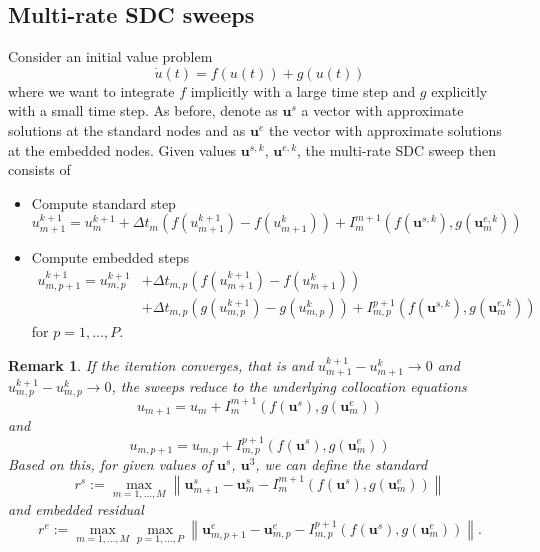 \documentclass{article}
\newtheorem{remark}{Remark}
\newcommand{\ve}[1]{\mathbf{#1}}
\begin{document}
\subsection*{Multi-rate SDC sweeps}
Consider an initial value problem
\begin{equation}
	\dot{u}(t) = f(u(t)) + g(u(t))
\end{equation}
where we want to integrate $f$ implicitly with a large time step and $g$ explicitly with a small time step.
As before, denote as $\ve{u}^s$ a vector with approximate solutions at the standard nodes and as $\ve{u}^{e}$ the vector with approximate solutions at the embedded nodes.
Given values $\ve{u}^{s,k}$, $\ve{u}^{e,k}$, the multi-rate SDC sweep then consists of
\begin{itemize}
\item Compute standard step
	\begin{equation}
		u^{k+1}_{m+1} = u^{k+1}_{m} + \Delta t_m \left( f(u^{k+1}_{m+1}) - f(u^k_{m+1}) \right) + I_{m}^{m+1} \left( f(\ve{u}^{s,k}) , g(\ve{u}^{e,k}_m) \right)
	\end{equation}
\item Compute embedded steps
	\begin{align*}
		u_{m,p+1}^{k+1} = u_{m,p}^{k+1} &+ \Delta t_{m,p} \left( f(u^{k+1}_{m+1}) - f(u^k_{m+1}) \right) \\
			& + \Delta t_{m,p} \left( g(u^{k+1}_{m,p}) - g(u^k_{m,p}) \right) + I_{m,p}^{p+1}  \left( f(\ve{u}^{s,k}) , g(\ve{u}^{e,k}_m) \right)
	\end{align*}
	for $p=1, \ldots, P$.
\end{itemize}
\begin{remark}
If the iteration converges, that is and $u^{k+1}_{m+1} - u^{k}_{m+1} \to 0$ and $u^{k+1}_{m,p} - u^{k}_{m,p} \to 0$, the sweeps reduce to the underlying collocation equations
\begin{equation}
	u_{m+1} = u_{m} + I_m^{m+1} \left( f(\ve{u}^{s}) , g(\ve{u}^{e}_m) \right)
\end{equation}
and
\begin{equation}
	u_{m,p+1} = u_{m,p} + I_{m,p}^{p+1} \left( f(\ve{u}^{s}) , g(\ve{u}^{e}_m) \right)
\end{equation}
Based on this, for given values of $\ve{u}^s$, $\ve{u}^3$, we can define the standard 
\begin{equation}
 r^s := \max_{m=1,\ldots,M} \left\| \ve{u}^s_{m+1} - \ve{u}^s_{m} - I_{m}^{m+1}\left( f(\ve{u}^{s}) , g(\ve{u}^{e}_m) \right) \right\|
\end{equation}
and embedded residual
\begin{equation}
	r^e := \max_{m=1,\ldots,M} \max_{p=1,\ldots,P} \left\| \ve{u}^e_{m,p+1} - \ve{u}^e_{m,p} - I_{m,p}^{p+1}\left( f(\ve{u}^{s}) , g(\ve{u}^{e}_m) \right) \right\|.
\end{equation}
\end{remark}
\end{document}
